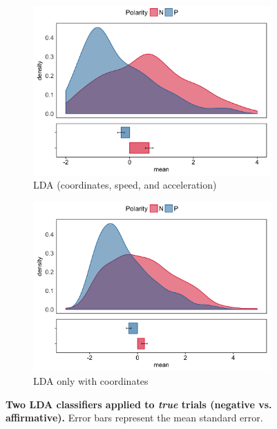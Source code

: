 \documentclass[11pt]{article}
\begin{document}
\begin{figure}
\centering
\begin{subfigure}[b]{0.45\textwidth}
\includegraphics[width=\textwidth]{OriginalLDA-negation.png}
\caption{LDA (coordinates, speed, and acceleration) }
\end{subfigure}
\begin{subfigure}[b]{0.45\textwidth}
\includegraphics[width=\textwidth]{CoordsLDA-negation.png}
\caption{LDA only with coordinates}
\end{subfigure}
\caption{\textbf{Two LDA classifiers applied to \textit{true} trials (negative vs. affirmative).} Error bars represent the mean standard error.  }
\label{fig:lda_negation}
\end{figure}
\end{document}
